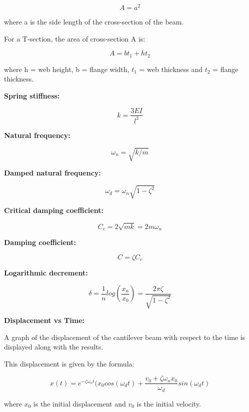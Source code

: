 \documentclass{report}
\begin{document}
$$ A = a^2 $$

where a is the side length of the cross-section of the beam.

For a T-section, the area of cross-section A is:

$$ A = bt_1 + ht_2 $$

where h = web height, b = flange width, $t_1$ = web thickness and $t_2$ = flange thickness.

\bigskip

{\bfseries Spring stiffness:}

$$ k = \frac{3EI}{l^3} $$

{\bfseries Natural frequency:}

$$ \omega_n = \sqrt{k/m} $$

{\bfseries Damped natural frequency:}

$$ \omega_d = \omega_n \sqrt{1-\zeta^2} $$

{\bfseries Critical damping coefficient:}

$$ C_c = 2\sqrt{mk} = 2m\omega_n $$

{\bfseries Damping coefficient:}

$$ C = \zeta C_c $$

{\bfseries Logarithmic decrement:}

$$ \delta = \frac{1}{n}log(\frac{x_n}{x_0}) = \frac{2\pi\zeta}{\sqrt{1-\zeta^2}}$$

{\bfseries Displacement vs Time:}

\bigskip

A graph of the displacement of the cantilever beam with respect to the time is displayed along with the results.

This displacement is given by the formula:

$$ x(t) = e^{-\zeta \omega_n t}(x_0 cos(\omega_d t) + \frac{v_0 + \zeta \omega_nx_0}{\omega_d}sin(\omega_d t)$$

where $x_0$ is the initial displacement and $v_0$ is the initial velocity. 
\end{document}
